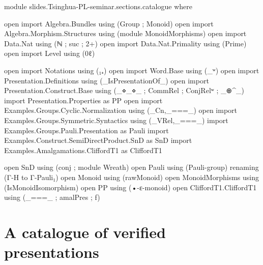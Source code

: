 \begin{code}[hide]
module slides.Tsinghua-PL-seminar.sections.catalogue where

open import Algebra.Bundles using (Group ; Monoid)
open import Algebra.Morphism.Structures using (module MonoidMorphisms)
open import Data.Nat using (ℕ ; suc ; 2+)
open import Data.Nat.Primality using (Prime)
open import Level using (0ℓ)

open import Notations using (₁₊)
open import Word.Base using (_ʷ)
open import Presentation.Definitions using (_IsPresentationOf_)
open import Presentation.Construct.Base using (_⋄_⋄_ ; CommRel ; ConjRelʷ ; _⊕^_)
import Presentation.Properties as PP
open import Examples.Groups.Cyclic.Normalization using (_Cn,_===_)
open import Examples.Groups.Symmetric.Syntactics using (_VRel,_===_)
import Examples.Groups.Pauli.Presentation as Pauli
import Examples.Construct.SemiDirectProduct.SnD as SnD
import Examples.Amalgamations.CliffordT1 as CliffordT1

open SnD using (conj ; module Wreath)
open Pauli using (Pauli-group) renaming (Γ-H to Γ-Pauli₁)
open Monoid using (rawMonoid)
open MonoidMorphisms using (IsMonoidIsomorphism)
open PP using (•-ε-monoid)
open CliffordT1.CliffordT1 using (_===_ ; amalPres ; f)
\end{code}
\PaperPart
\section{A catalogue of verified presentations}

